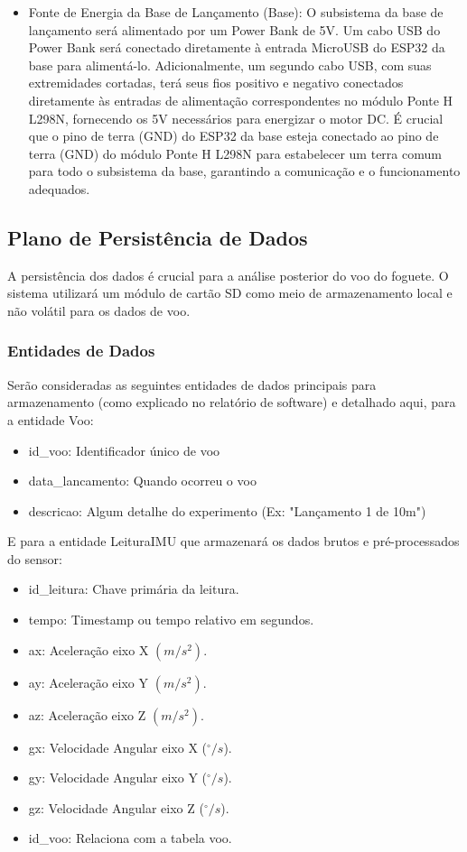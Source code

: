 \begin{itemize}
    \item Fonte de Energia da Base de Lançamento (Base): O subsistema da base de lançamento será alimentado por um Power Bank de 5V. Um cabo USB do Power Bank será conectado diretamente à entrada MicroUSB do ESP32 da base para alimentá-lo. Adicionalmente, um segundo cabo USB, com suas extremidades cortadas, terá seus fios positivo e negativo conectados diretamente às entradas de alimentação correspondentes no módulo Ponte H L298N, fornecendo os 5V necessários para energizar o motor DC. É crucial que o pino de terra (GND) do ESP32 da base esteja conectado ao pino de terra (GND) do módulo Ponte H L298N para estabelecer um terra comum para todo o subsistema da base, garantindo a comunicação e o funcionamento adequados.
\end{itemize}

\subsection{Plano de Persistência de Dados}
A persistência dos dados é crucial para a análise posterior do voo do foguete. O sistema utilizará um módulo de cartão SD como meio de armazenamento local e não volátil para os dados de voo.

\subsubsection{Entidades de Dados}
Serão consideradas as seguintes entidades de dados principais para armazenamento (como explicado no relatório de software) e detalhado aqui, para a entidade Voo:
\begin{itemize}
    \item id\_voo: Identificador único de voo
    \item data\_lancamento: Quando ocorreu o voo
    \item descricao: Algum detalhe do experimento (Ex: "Lançamento 1 de 10m")
\end{itemize}

E para a entidade LeituraIMU que armazenará os dados brutos e pré-processados do sensor:

\begin{itemize}
    \item id\_leitura: Chave primária da leitura.
    \item tempo: Timestamp ou tempo relativo em segundos.
    \item ax: Aceleração eixo X $(m/s^2)$.
    \item ay: Aceleração eixo Y $(m/s^2)$.
    \item az: Aceleração eixo Z $(m/s^2)$.
    \item gx: Velocidade Angular eixo X ($^\circ/s$).
    \item gy: Velocidade Angular eixo Y ($^\circ/s$).
    \item gz: Velocidade Angular eixo Z ($^\circ/s$).
    \item id\_voo: Relaciona com a tabela voo.
\end{itemize}

